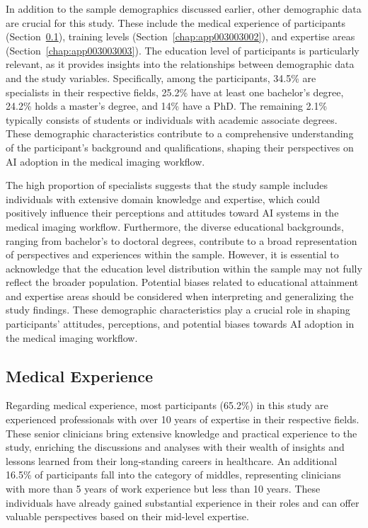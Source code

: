 In addition to the sample demographics discussed earlier, other demographic data are crucial for this study.
These include the medical experience of participants (Section~\ref{chap:app003003001}), training levels (Section~\ref{chap:app003003002}), and expertise areas (Section~\ref{chap:app003003003}).
The education level of participants is particularly relevant, as it provides insights into the relationships between demographic data and the study variables.
Specifically, among the participants, 34.5\% are specialists in their respective fields, 25.2\% have at least one bachelor's degree, 24.2\% holds a master's degree, and 14\% have a PhD.
The remaining 2.1\% typically consists of students or individuals with academic associate degrees.
These demographic characteristics contribute to a comprehensive understanding of the participant's background and qualifications, shaping their perspectives on \ac{AI} adoption in the medical imaging workflow.



The high proportion of specialists suggests that the study sample includes individuals with extensive domain knowledge and expertise, which could positively influence their perceptions and attitudes toward AI systems in the medical imaging workflow.
Furthermore, the diverse educational backgrounds, ranging from bachelor's to doctoral degrees, contribute to a broad representation of perspectives and experiences within the sample.
However, it is essential to acknowledge that the education level distribution within the sample may not fully reflect the broader population.
Potential biases related to educational attainment and expertise areas should be considered when interpreting and generalizing the study findings.
These demographic characteristics play a crucial role in shaping participants' attitudes, perceptions, and potential biases towards \ac{AI} adoption in the medical imaging workflow.

\subsection{Medical Experience}
\label{chap:app003003001}

Regarding medical experience, most participants (65.2\%) in this study are experienced professionals with over 10 years of expertise in their respective fields.
These senior clinicians bring extensive knowledge and practical experience to the study, enriching the discussions and analyses with their wealth of insights and lessons learned from their long-standing careers in healthcare.
An additional 16.5\% of participants fall into the category of middles, representing clinicians with more than 5 years of work experience but less than 10 years.
These individuals have already gained substantial experience in their roles and can offer valuable perspectives based on their mid-level expertise.

